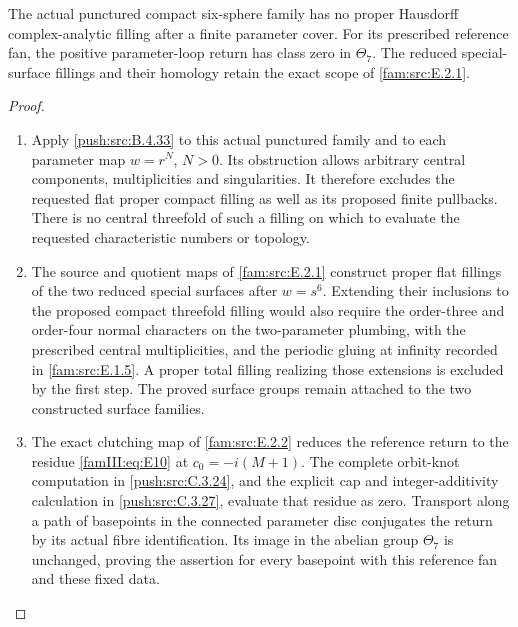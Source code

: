 \begin{remark}\label{fam:src:E.2.3}
The actual punctured compact six-sphere family has no proper
Hausdorff complex-analytic filling after a finite parameter cover.
For its prescribed reference fan, the positive parameter-loop
return has class zero in \(\Theta_7\). The reduced special-surface
fillings and their homology retain the exact scope of
\cref{fam:src:E.2.1}.
\end{remark}
\begin{proof}
\begin{enumerate}[label=\arabic*.]
\item Apply \cref{push:src:B.4.33} to this actual punctured family
and to each parameter map \(w=r^N\), \(N>0\). Its obstruction
allows arbitrary central components, multiplicities and singularities.
It therefore excludes the requested flat proper compact filling as
well as its proposed finite pullbacks. There is no central threefold
of such a filling on which to evaluate the requested characteristic
numbers or topology.
\item The source and quotient maps of \cref{fam:src:E.2.1}
construct proper flat fillings of the two reduced special surfaces
after \(w=s^6\). Extending their inclusions to the proposed compact
threefold filling would also require the order-three and order-four
normal characters on the two-parameter plumbing, with the prescribed
central multiplicities, and the periodic gluing at infinity recorded
in \cref{fam:src:E.1.5}. A proper total filling realizing those
extensions is excluded by the first step. The proved surface groups
remain attached to the two constructed surface families.
\item The exact clutching map of \cref{fam:src:E.2.2} reduces the
reference return to the residue \eqref{famIII:eq:E10} at
\(c_0=-i(M+1)\). The complete orbit-knot computation in
\cref{push:src:C.3.24}, and the explicit cap and integer-additivity
calculation in \cref{push:src:C.3.27}, evaluate that residue as zero.
Transport along a path of basepoints in the connected parameter disc
conjugates the return by its actual fibre identification. Its image
in the abelian group \(\Theta_7\) is unchanged, proving the assertion
for every basepoint with this reference fan and these fixed data.
\end{enumerate}
\end{proof}
